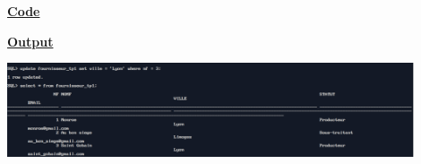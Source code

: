 \newpage
{}

\textbf{\underline{Code}}


\vspace{1cm}
\textbf{\underline{Output}}
\vspace{1cm}
\begin{center}
    \includegraphics[width=0.9\textwidth]{Questions/q41/q41.png}
\end{center}
